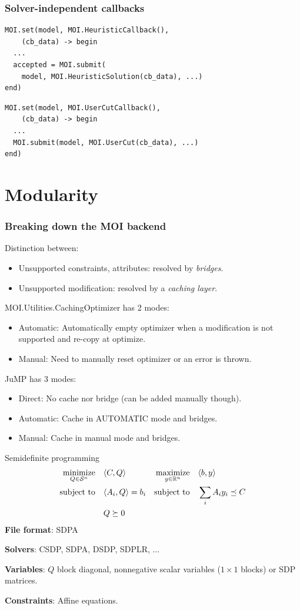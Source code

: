 \documentclass{beamer}
\begin{document}
  \begin{frame}[fragile]
    \frametitle{Solver-independent callbacks}
\begin{verbatim}
MOI.set(model, MOI.HeuristicCallback(),
	(cb_data) -> begin
  ...
  accepted = MOI.submit(
    model, MOI.HeuristicSolution(cb_data), ...)
end)
\end{verbatim}
\begin{verbatim}
MOI.set(model, MOI.UserCutCallback(),
	(cb_data) -> begin
  ...
  MOI.submit(model, MOI.UserCut(cb_data), ...)
end)
\end{verbatim}
  \end{frame}


\section{Modularity}

  \begin{frame}[fragile]
    \frametitle{Breaking down the MOI backend}
    Distinction between:
    \begin{itemize}
      \item Unsupported constraints, attributes: resolved by \emph{bridges}.
      \item Unsupported modification: resolved by a \emph{caching layer}.
    \end{itemize}
    MOI.Utilities.CachingOptimizer has 2 modes:
    \begin{itemize}
      \item Automatic: Automatically empty optimizer when a modification is not supported and re-copy at optimize.
      \item Manual: Need to manually reset optimizer or an error is thrown.
    \end{itemize}
    JuMP has 3 modes:
    \begin{itemize}
      \item Direct: No cache nor bridge (can be added manually though).
      \item Automatic: Cache in AUTOMATIC mode and bridges.
      \item Manual: Cache in manual mode and bridges.
    \end{itemize}
  \end{frame}

  \begin{frame}{Semidefinite programming}
    \begin{align*}
      \operatorname*{minimize}_{Q \in \mathcal{S}^{n}} \quad & \langle C, Q \rangle & \operatorname*{maximize}_{y \in \mathbb{R}^n} \quad & \langle b, y \rangle\\
      \operatorname*{\operatorname*{\text{subject to}}\quad} & \langle A_i, Q \rangle = b_i & \operatorname*{\operatorname*{\text{subject to}}\quad} & \sum_i A_i y_i \preceq C\\
        & Q \succeq 0
    \end{align*}
    \textbf{File format}: SDPA

    \textbf{Solvers}: CSDP, SDPA, DSDP, SDPLR, ...

    \textbf{Variables}: $Q$ block diagonal, nonnegative scalar variables ($1 \times 1$ blocks) or SDP matrices.

    \textbf{Constraints}: Affine equations.
  \end{frame}
\end{document}
